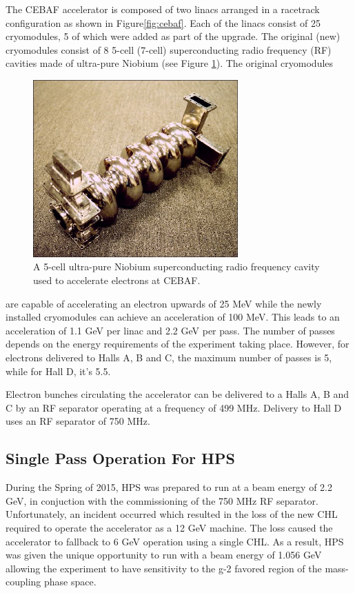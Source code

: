 The CEBAF accelerator is composed of two linacs arranged in a racetrack
configuration as shown in Figure\ref{fig:cebaf}. Each of the linacs consist
of 25 cryomodules, 5 of which were added as part of the upgrade.  The original
(new) cryomodules consist of 8 5-cell (7-cell) superconducting radio frequency
(RF) cavities made of ultra-pure Niobium (see Figure \ref{fig:cebaf_cavity}).  
The original cryomodules
\begin{figure}[h]
    \centering
    \includegraphics[width=0.7\textwidth]{images/cebaf_cavity.jpg}
    \caption{A 5-cell ultra-pure Niobium superconducting radio frequency cavity
             used to accelerate electrons at CEBAF.}
    \label{fig:cebaf_cavity}
\end{figure}
are capable of accelerating an electron upwards of 25 MeV while the newly installed
cryomodules can achieve an acceleration of 100 MeV.  This leads to an acceleration
of 1.1 GeV per linac and 2.2 GeV per pass. The 
number of passes depends on the energy requirements of the experiment taking place.
However, for electrons delivered to Halls A, B and C, the maximum number of passes
is 5, while for Hall D, it's 5.5.

Electron bunches circulating the accelerator can be delivered to a Halls A, B
and C by an RF separator operating at a frequency of 499 MHz.  Delivery to Hall
D uses an RF separator of 750 MHz.

\subsection{Single Pass Operation For HPS}

During the Spring of 2015, HPS was prepared to run at a beam energy of 2.2 GeV,
in conjuction with the commissioning of the 750 MHz RF separator.
Unfortunately, an incident occurred which resulted in the loss of the new CHL
required to operate the accelerator as a 12 GeV machine.
The loss caused the accelerator to 
fallback to 6 GeV operation using a single CHL.  As a result, HPS was given
the unique opportunity to run with a beam energy of 1.056 GeV allowing the
experiment to have sensitivity to the g-2 favored region of the mass-coupling
phase space.  

